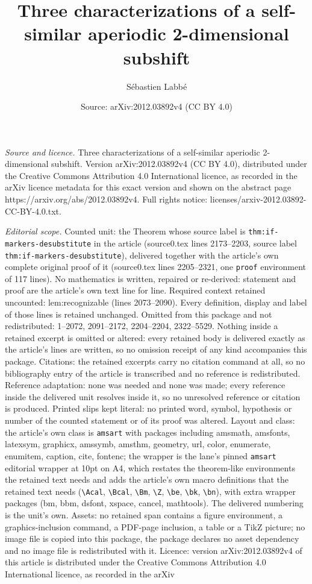 \documentclass[10pt,a4paper]{amsart}
\title[Three characterizations of a self-similar aperiodic 2-dimens]{Three characterizations of a self-similar aperiodic 2-dimensional subshift}
\author{S\'ebastien Labb\'e}
\date{Source: arXiv:2012.03892v4 (CC BY 4.0)}
\begin{document}
\maketitle

\noindent\emph{Source and licence.} Three characterizations of a self-similar aperiodic 2-dimensional subshift. Version arXiv:2012.03892v4 (CC BY 4.0), distributed under the Creative Commons Attribution 4.0 International licence, as recorded in the arXiv licence metadata for this exact version and shown on the abstract page https://arxiv.org/abs/2012.03892v4. Full rights notice: licenses/arxiv-2012.03892-CC-BY-4.0.txt.\par\smallskip

\noindent\textit{Editorial scope.} Counted unit: the Theorem whose source label is \texttt{thm:if-markers-desubstitute} in the article (source0.tex lines 2173--2203, source label \texttt{thm:if-markers-desubstitute}), delivered together with the article's own complete original proof of it (source0.tex lines 2205--2321, one \texttt{proof} environment of 117 lines). No mathematics is written, repaired or re-derived: statement and proof are the article's own text line for line. Required context retained uncounted: lem:recognizable (lines 2073--2090). Every definition, display and label of those lines is retained unchanged. Omitted from this package and not redistributed: 1--2072, 2091--2172, 2204--2204, 2322--5529. Nothing inside a retained excerpt is omitted or altered: every retained body is delivered exactly as the article's lines are written, so no omission receipt of any kind accompanies this package. Citations: the retained excerpts carry no citation command at all, so no bibliography entry of the article is transcribed and no reference is redistributed. Reference adaptation: none was needed and none was made; every reference inside the delivered unit resolves inside it, so no unresolved reference or citation is produced. Printed slips kept literal: no printed word, symbol, hypothesis or number of the counted statement or of its proof was altered. Layout and class: the article's own class is \texttt{amsart} with packages including amsmath, amsfonts, latexsym, graphicx, amssymb, amsthm, geometry, url, color, enumerate, enumitem, caption, cite, fontenc; the wrapper is the lane's pinned \texttt{amsart} editorial wrapper at 10pt on A4, which restates the theorem-like environments the retained text needs and adds the article's own macro definitions that the retained text needs (\texttt{\textbackslash Acal}, \texttt{\textbackslash Bcal}, \texttt{\textbackslash Bm}, \texttt{\textbackslash Z}, \texttt{\textbackslash be}, \texttt{\textbackslash bk}, \texttt{\textbackslash bn}), with extra wrapper packages (bm, bbm, dsfont, xspace, cancel, mathtools). The delivered numbering is the unit's own. Assets: no retained span contains a figure environment, a graphics-inclusion command, a PDF-page inclusion, a table or a TikZ picture; no image file is copied into this package, the package declares no asset dependency and no image file is redistributed with it. Licence: version arXiv:2012.03892v4 of this article is distributed under the Creative Commons Attribution 4.0 International licence, as recorded in the arXiv 
\end{document}
